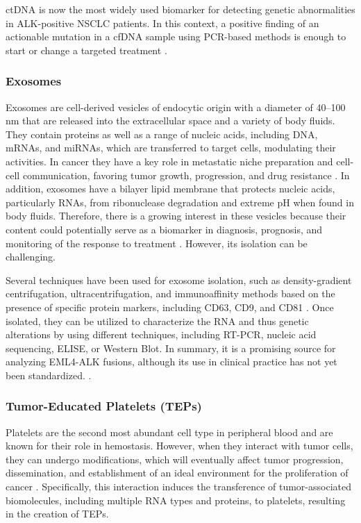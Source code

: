 ctDNA is now the most widely used biomarker for detecting genetic abnormalities in ALK-positive NSCLC patients. In this context, a positive finding of an actionable mutation in a cfDNA sample using PCR-based methods is enough to start or change a targeted treatment \cite{LB_NSCLC}.

\subsubsection{Exosomes}

Exosomes are cell-derived vesicles of endocytic origin with a diameter of 40–100 nm that are released into the extracellular space and a variety of body fluids. They contain proteins as well as a range of nucleic acids, including DNA, mRNAs, and miRNAs, which are transferred to target cells, modulating their activities. In cancer they have a key role in metastatic niche preparation and cell-cell communication, favoring tumor growth, progression, and drug resistance \cite{Exosomes}. In addition, exosomes have a bilayer lipid membrane that protects nucleic acids, particularly RNAs, from ribonuclease degradation and extreme pH when found in body fluids. Therefore, there is a growing interest in these vesicles because their content could potentially serve as a biomarker in diagnosis, prognosis, and monitoring of the response to treatment \cite{LB_NSCLC, LB_atocha}. However, its isolation can be challenging.

Several techniques have been used for exosome isolation, such as density-gradient centrifugation, ultracentrifugation, and immunoaffinity methods based on the presence of specific protein markers, including CD63, CD9, and CD81 \cite{Exosomes}. Once isolated, they can be utilized to characterize the RNA and thus genetic alterations by using different techniques, including RT-PCR, nucleic acid sequencing, ELISE, or Western Blot. In summary, it is a promising source for analyzing EML4-ALK fusions, although its use in clinical practice has not yet been standardized. \cite{LB_atocha}.

\subsubsection{Tumor-Educated Platelets (TEPs)}

Platelets are the second most abundant cell type in peripheral blood and are known for their role in hemostasis. However, when they interact with tumor cells, they can undergo modifications, which will eventually affect tumor progression, dissemination, and establishment of an ideal environment for the proliferation of cancer \cite{Metastasis, Angiogenesis}. Specifically, this interaction induces the transference of tumor-associated biomolecules, including multiple RNA types and proteins, to platelets, resulting in the creation of TEPs.

